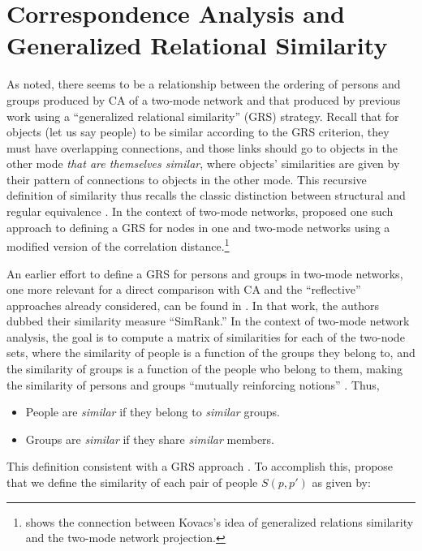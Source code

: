 \documentclass[a4paper,fleqn]{cas-sc}
\begin{document}
\section{Correspondence Analysis and Generalized Relational Similarity} \label{sec:cagensim}
As noted, there seems to be a relationship between the ordering of persons and groups produced by CA of a two-mode network and that produced by previous work using a ``generalized relational similarity'' (GRS) strategy. Recall that for objects (let us say people) to be similar according to the GRS criterion, they must have overlapping connections, and those links should go to objects in the other mode \textit{that are themselves similar}, where objects' similarities are given by their pattern of connections to objects in the other mode. This recursive definition of similarity thus recalls the classic distinction between structural and regular equivalence \citep{everett1994regular}. In the context of two-mode networks, \citet{kovacs2010generalized} proposed one such approach to defining a GRS for nodes in one and two-mode networks using a modified version of the correlation distance.\footnote{\citet{lizardo2024two} shows the connection between Kovacs's idea of generalized relations similarity and the two-mode network projection.}

An earlier effort to define a GRS for persons and groups in two-mode networks, one more relevant for a direct comparison with CA and the ``reflective'' approaches already considered, can be found in \citet{jeh2002simrank}. In that work, the authors dubbed their similarity measure ``SimRank.'' In the context of two-mode network analysis, the goal is to compute a matrix of similarities for each of the two-node sets, where the similarity of people is a function of the groups they belong to, and the similarity of groups is a function of the people who belong to them, making the similarity of persons and groups ``mutually reinforcing notions'' \citep[540]{jeh2002simrank}. Thus,

\begin{itemize}
    \item People are \textit{similar} if they belong to \textit{similar} groups.
    \item Groups are \textit{similar} if they share \textit{similar} members.
\end{itemize}

This definition consistent with a GRS approach \citep[see][]{kovacs2010generalized, lizardo2024two}. To accomplish this, \citet[540, eq. 2 and eq. 3]{jeh2002simrank} propose that we define the similarity of each pair of people $S(p, p')$  as given by:
\end{document}
